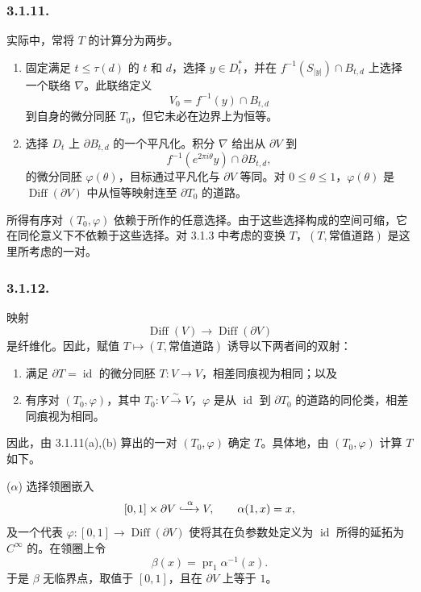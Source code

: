 \subsubsection*{3.1.11.}
实际中，常将 $T$ 的计算分为两步。

\begin{enumerate}[label=(\alph*)]
\item 固定满足 $t\leq\tau(d)$ 的 $t$ 和 $d$，选择 $y\in D_t^*$，并在 $f^{-1}(S_{|y|})\cap B_{t,d}$ 上选择一个联络 $\nabla$。此联络定义
\[
  V_0=f^{-1}(y)\cap B_{t,d}
  \]
到自身的微分同胚 $T_0$，但它未必在边界上为恒等。
\item 选择 $D_t$ 上 $\partial B_{t,d}$ 的一个平凡化。积分 $\nabla$ 给出从 $\partial V$ 到
\[
  f^{-1}(e^{2\pi i\theta}y)\cap\partial B_{t,d},
  \]
的微分同胚 $\varphi(\theta)$，目标通过平凡化与 $\partial V$ 等同。对 $0\leq\theta\leq1$，$\varphi(\theta)$ 是 $\operatorname{Diff}(\partial V)$ 中从恒等映射连至 $\partial T_0$ 的道路。
\end{enumerate}

所得有序对 $(T_0,\varphi)$ 依赖于所作的任意选择。由于这些选择构成的空间可缩，它在同伦意义下不依赖于这些选择。对 3.1.3 中考虑的变换 $T$，$(T,\text{常值道路})$ 是这里所考虑的一对。

\subsubsection*{3.1.12.}
映射
\[
\operatorname{Diff}(V)\longrightarrow\operatorname{Diff}(\partial V)
\]
是纤维化。因此，赋值 $T\mapsto(T,\text{常值道路})$ 诱导以下两者间的双射：

\begin{enumerate}[label=\alph*)]
\item 满足 $\partial T=\operatorname{id}$ 的微分同胚 $T:V\to V$，相差同痕视为相同；以及
\item 有序对 $(T_0,\varphi)$，其中 $T_0:V\xrightarrow{\sim}V$，$\varphi$ 是从 $\operatorname{id}$ 到 $\partial T_0$ 的道路的同伦类，相差同痕视为相同。
\end{enumerate}

因此，由 3.1.11(a),(b) 算出的一对 $(T_0,\varphi)$ 确定 $T$。具体地，由 $(T_0,\varphi)$ 计算 $T$ 如下。

\medskip
\noindent\textup{($\alpha$)} 选择领圈嵌入
\[
  [0,1]\times\partial V\xhookrightarrow{\ \alpha\ }V,
  \qquad \alpha(1,x)=x,
  \]
及一个代表
$\varphi:[0,1]\to\operatorname{Diff}(\partial V)$
使将其在负参数处定义为 $\operatorname{id}$ 所得的延拓为 $C^\infty$ 的。在领圈上令
\[
  \beta(x)=\operatorname{pr}_1\alpha^{-1}(x).
  \]
于是 $\beta$ 无临界点，取值于 $[0,1]$，且在 $\partial V$ 上等于 $1$。

